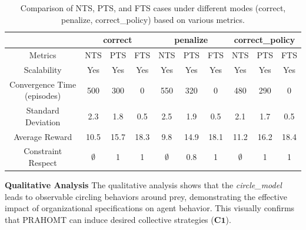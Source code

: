 \documentclass[runningheads]{llncs}
\theoremstyle{freethm}
\theoremstyle{proofoutline}
\begin{document}
\begin{table}[h!]
    \centering
    \begin{tabular}{|c|c|c|c|c|c|c|c|c|c|}
        \hline
                                    & \multicolumn{3}{c|}{correct} & \multicolumn{3}{c|}{penalize} & \multicolumn{3}{c|}{correct\_policy}                                                         \\
        \hline
        Metrics                     & NTS                          & PTS                           & FTS                                  & NTS         & PTS  & FTS  & NTS         & PTS  & FTS  \\
        \hline
        Scalability                 & Yes                          & Yes                           & Yes                                  & Yes         & Yes  & Yes  & Yes         & Yes  & Yes  \\
        Convergence Time (episodes) & 500                          & 300                           & 0                                    & 550         & 320  & 0    & 480         & 290  & 0    \\
        Standard Deviation          & 2.3                          & 1.8                           & 0.5                                  & 2.5         & 1.9  & 0.5  & 2.1         & 1.7  & 0.5  \\
        Average Reward              & 10.5                         & 15.7                          & 18.3                                 & 9.8         & 14.9 & 18.1 & 11.2        & 16.2 & 18.4 \\
        Constraint Respect          & $\emptyset$                  & 1                             & 1                                    & $\emptyset$ & 0.8  & 1    & $\emptyset$ & 1    & 1    \\
        \hline
    \end{tabular}
    \caption{Comparison of NTS, PTS, and FTS cases under different modes (correct, penalize, correct\_policy) based on various metrics.}
    \label{tab:results}
\end{table}


\textbf{Qualitative Analysis} \quad The qualitative analysis shows that the \textit{circle\_model} leads to observable circling behaviors around prey, demonstrating the effective impact of organizational specifications on agent behavior. This visually \footnotemark[2] confirms that PRAHOMT can induce desired collective strategies ($\mathbf{C1}$).

\end{document}
